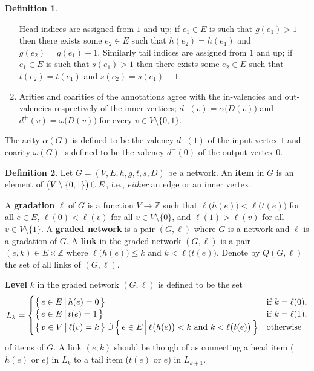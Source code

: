 \documentclass{article}
\makeatletter
\newcommand{\N}{\mathbb{N}}
\newcommand{\Z}{\mathbb{Z}}
\newcommand{\Fpil}{\longrightarrow}
\newcommand{\mc}{\mathcal}
\newcommand{\cupd}{\mathbin{\dot{{\cup}}}}
\newcommand*{\setOf}[3][\@gobble]{%
   \left\{ \, #2 \,\,\vrule\relax#1.\,\, #3 \, \right\}%
}
\theoremstyle{definition}
\newtheorem{definition}{Definition}
\providecommand*{\DefOrd}[2][]{\textbf{#2}}
\makeatother
\begin{document}
\begin{definition}
\begin{enumerate}
      Head indices are assigned from $1$ and up; if \(e_1 \in E\) is 
      such that \(g(e_1)>1\) then there exists some \(e_2 \in E\) such 
      that \(h(e_2)=h(e_1)\) and \(g(e_2) = g(e_1)-1\). Similarly 
      tail indices are assigned from $1$ and up; if \(e_1 \in E\) is 
      such that \(s(e_1)>1\) then there exists some \(e_2 \in E\) such 
      that \(t(e_2)=t(e_1)\) and \(s(e_2) = s(e_1)-1\).
    \item \label{A4:Network}
      Arities and coarities of the annotations agree with the 
      in-valencies and out-valencies respectively of the inner vertices; 
      \(d^-(v) = \alpha\bigl( D(v) \bigr)\) and 
      \(d^+(v) = \omega\bigl( D(v) \bigr)\) for every \(v \in V 
      \setminus \{0,1\}\).
  \end{enumerate}
  The arity $\alpha(G)$ is defined to be the valency $d^+(1)$ of the 
  input vertex $1$ and coarity $\omega(G)$ is defined to be the 
  valency \(d^-(0)\) of the output vertex $0$.
\end{definition}


\begin{definition}
  Let $G=(V,E,h,g,t,s,D)$ be a network. An \DefOrd{item} in $G$ is an 
  element of $\bigl( V \setminus\nobreak \{0,1\} \bigr) \cupd E$, i.e., 
  \emph{either} an edge or an inner vertex.
  
  A \DefOrd{gradation} $\ell$ of $G$ is a function \(V \Fpil \Z\) such 
  that \(\ell\bigl( h(e) \bigr) < \ell\bigl( t(e) \bigr) \) for all 
  \(e \in E\), \(\ell(0) < \ell(v)\) for all \(v \in V\setminus\{0\}\), 
  and \(\ell(1) > \ell(v)\) for all \(v \in V\setminus\{1\}\). A 
  \DefOrd{graded network} is a pair $(G,\ell)$ where $G$ is a network 
  and $\ell$ is a gradation of $G$. A \DefOrd{link} in the graded 
  network $(G,\ell)$ is a pair \((e,k) \in E \times \Z\) where 
  \(\ell\bigl( h(e) \bigr) \leqslant k\) and \(k < \ell\bigl( t(e) 
  \bigr)\). Denote by $Q(G,\ell)$ the set of all links of $(G,\ell)$.
  
  \DefOrd[*{level}]{Level} $k$ in the graded network $(G,\ell)$ is 
  defined to be the set
  \begin{equation*}
    L_k = \begin{cases}
      \setOf[\big]{ e \in E }{ h(e) = 0 }& \text{if \(k=\ell(0)\),}\\
      \setOf[\big]{ e \in E }{ t(e) = 1 }& \text{if \(k=\ell(1)\),}\\
      \setOf[\big]{ v \in V }{ \ell(v) = k } \cupd
        \setOf[\Big]{ e \in E }{ \ell\bigl( h(e) \bigr) < k
          \text{ and } k < \ell\bigl( t(e) \bigr) }
        & \text{otherwise}
     \end{cases}
  \end{equation*}
  of items of $G$. A link $(e,k)$ should be though of as connecting 
  a head item ($h(e)$ or $e$) in $L_k$ to a tail item ($t(e)$ or $e$) in 
  $L_{k+1}$. 
\end{definition}
\end{document}
